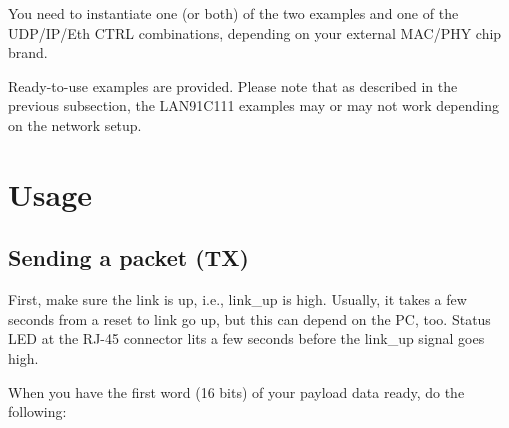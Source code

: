 \documentclass[a4paper,10pt,oneside,final]{article}
\begin{document}
You need to instantiate one (or both) of the two examples and one of the
UDP/IP/Eth CTRL combinations, depending on your external MAC/PHY chip brand.

Ready-to-use examples are provided. Please note that as described in the
previous subsection, the LAN91C111 examples may or may not work depending
on the network setup.

\newpage
\section{Usage}
\subsection{Sending a packet (TX)}

First, make sure the link is up, i.e., link\_up is high. Usually, it
takes a few seconds from a reset to link go up, but this can depend on
the PC, too. Status LED at the RJ-45 connector lits a few seconds
before the link\_up signal goes high.

When you have the first word (16 bits) of your payload data ready, do
the following:
\end{document}

